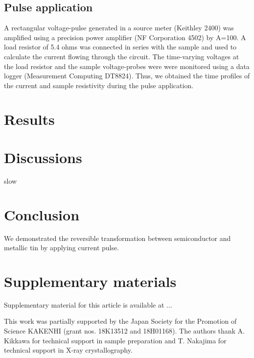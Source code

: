 \documentclass[aip,apl,reprint]{revtex4-1}
\begin{document}
\subsection{Pulse application}
A rectangular voltage-pulse generated in a source meter (Keithley 2400) was amplified using a precision power amplifier (NF Corporation 4502) by A=100. A load resistor of 5.4 ohms was connected in series with the sample and used to calculate the current flowing through the circuit. The time-varying voltages at the load resistor and the sample voltage-probes were were monitored using a data logger (Measurement Computing DT8824). Thus, we obtained the time profiles of the current and sample resistivity during the pulse application. 

\section{Results}


\section{Discussions}
slow\cite{oike}

\section{Conclusion}
We demonstrated the reversible transformation between semiconductor and metallic tin by applying current pulse.

\section{Supplementary materials}
Supplementary material for this article is available at ...

\begin{acknowledgments}
This work was partially supported by the Japan Society for the Promotion of Science KAKENHI (grant nos. 18K13512 and 18H01168).
The authors thank A. Kikkawa for technical support in sample preparation and T. Nakajima for technical support in X-ray crystallography.
\end{acknowledgments}


\end{document}

